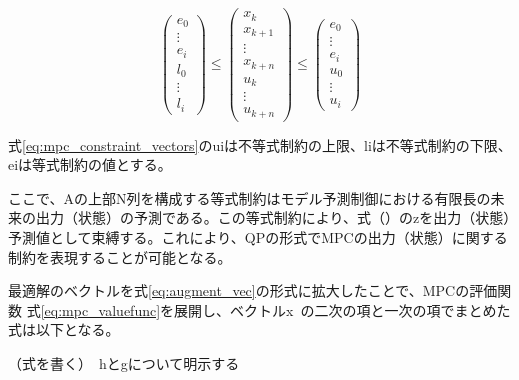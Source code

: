 \begin{equation}
  \begin{pmatrix}
    e_{0}\\
    \vdots \\
    e_{i}\\
    l_{0}\\
    \vdots\\
    l_{i}
  \end{pmatrix}
  \leq
  \begin{pmatrix}
    x_{k} \\ x_{k+1} \\ \vdots \\ x_{k+n}
    \\
    u_{k} \\ \vdots \\ u_{k+n}
  \end{pmatrix}
  \leq
  \begin{pmatrix}
    e_{0}\\
    \vdots\\
    e_{i}\\
    u_{0}\\
    \vdots\\
    u_{i}
  \end{pmatrix}
\end{equation}

式\eqref{eq:mpc_constraint_vectors}のuiは不等式制約の上限、liは不等式制約の下限、eiは等式制約の値とする。

ここで、Aの上部N列を構成する等式制約はモデル予測制御における有限長の未来の出力（状態）の予測である。この等式制約により、式（）のzを出力（状態）予測値として束縛する。これにより、QPの形式でMPCの出力（状態）に関する制約を表現することが可能となる。

最適解のベクトルを式\eqref{eq:augment_vec}の形式に拡大したことで、MPCの評価関数 式\eqref{eq:mpc_valuefunc}を展開し、ベクトルx~の二次の項と一次の項でまとめた式は以下となる。

（式を書く）　hとgについて明示する
